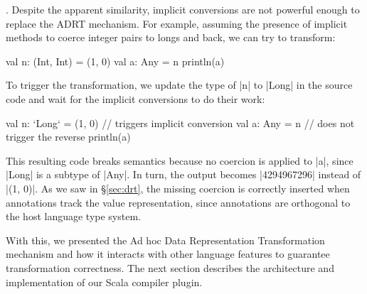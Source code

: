 \noindent
{}. Despite the apparent similarity, implicit conversions are not powerful enough to replace the ADRT mechanism. For example, assuming the presence of implicit methods to coerce integer pairs to longs and back, we can try to transform:

\begin{lstlisting-nobreak}
val n: (Int, Int) = (1, 0)
val a: Any = n
println(a)
\end{lstlisting-nobreak}

\noindent
To trigger the transformation, we update the type of |n| to |Long| in the source code and wait for the implicit conversions to do their work:

\begin{lstlisting-nobreak}
val n: `Long` = (1, 0) // triggers implicit conversion
val a: Any = n              // does not trigger the reverse
println(a)
\end{lstlisting-nobreak}

This resulting code breaks semantics because no coercion is applied to |a|, since |Long| is a subtype of |Any|. In turn, the output becomes |4294967296| instead of |(1, 0)|. As we saw in \S\ref{sec:drt}, the missing coercion is correctly inserted when annotations track the value representation, since annotations are orthogonal to the host language type system.

With this, we presented the Ad hoc Data Representation Transformation mechanism and how it interacts with other language features to guarantee transformation correctness. The next section describes the architecture and implementation of our Scala compiler plugin. 
